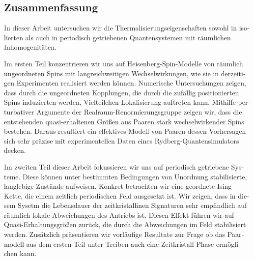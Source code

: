 \vfill
\begin{otherlanguage}{ngerman}
\chapter*{Zusammenfassung}

In dieser Arbeit untersuchen wir die Thermalisierungseigenschaften sowohl in isolierten als auch in periodisch getriebenen Quantensystemen mit räumlichen Inhomogenitäten.

Im ersten Teil konzentrieren wir uns auf Heisenberg-Spin-Modelle von räumlich ungeordneten Spins mit langreichweitigen Wechselwirkungen, wie sie in derzeitigen Experimenten realisiert werden können. Numerische Untersuchungen zeigen, dass durch die ungeordneten Kopplungen, die durch die zufällig positionierten Spins induzierten werden, Vielteilchen-Lokalisierung auftreten kann. Mithilfe perturbativer Argumente der Realraum-Renormierungsgruppe zeigen wir, dass die entstehenden quasi-erhaltenen Größen aus Paaren stark wechselwirkender Spins bestehen. Daraus resultiert ein effektives Modell von Paaren dessen Vorhersagen sich sehr präzise mit experimentellen Daten eines Rydberg-Quantensimulators decken.

Im zweiten Teil dieser Arbeit fokussieren wir uns auf periodisch getriebene Systeme. Diese können unter bestimmten Bedingungen von Unordnung stabilisierte, langlebige Zustände aufweisen. Konkret betrachten wir eine geordnete Ising-Kette, die einem zeitlich periodischen Feld ausgesetzt ist. Wir zeigen, dass in diesem Sysetm die Lebensdauer der zeitkristallinen Signaturen sehr empfindlich auf räumlich lokale Abweichungen des Antriebs ist. Diesen Effekt führen wir auf Quasi-Erhaltungsgrößen zurück, die durch die Abweichungen im Feld stabilisiert werden. Zusätzlich präsentieren wir vorläufige Resultate zur Frage ob das Paarmodell aus dem ersten Teil unter Treiben auch eine Zeitkristall-Phase ermöglichen kann.
\end{otherlanguage}

\endgroup

\vfill

\color{black}
